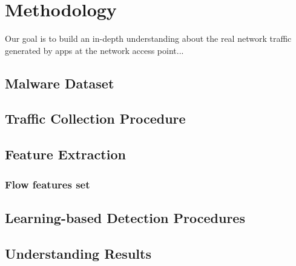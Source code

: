 \section{Methodology}\label{sec:Methodology}

Our goal is to build an in-depth understanding about the real network traffic generated by apps at the network access point...

\subsection{Malware Dataset}\label{sec:dataset}

\subsection{Traffic Collection Procedure}\label{sec:traffic}

\subsection{Feature Extraction}\label{sec:extraction}

\subsubsection{Flow features set}\label{sec:set}

\subsection{Learning-based Detection Procedures}\label{sec:learning}

\subsection{Understanding Results}\label{sec:understand}
